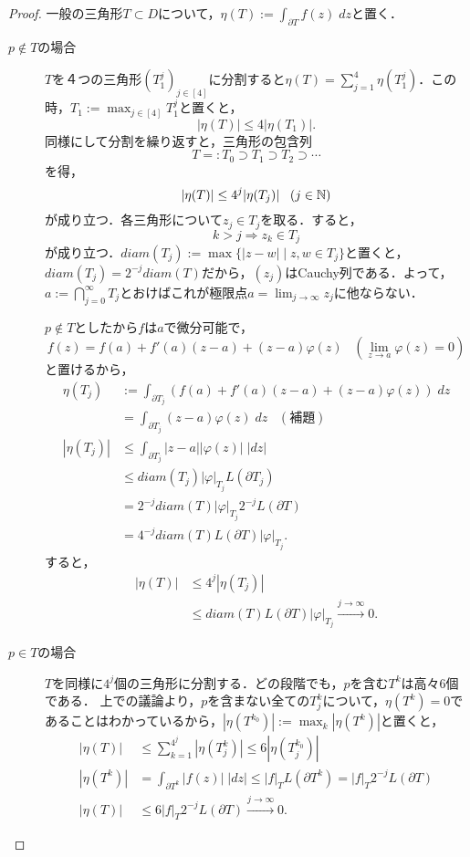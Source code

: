 \documentclass[uplatex, dvipdfmx]{jsreport}
\begin{document}
\begin{proof}
    一般の三角形$T\subset D$について，$\eta(T):=\int_{\partial T}f(z)\;dz$と置く．
    \begin{description}
        \item[$p\notin T$の場合] $T$を４つの三角形$(T_1^j)_{j\in[4]}$に分割すると$\eta(T)=\sum^4_{j=1}\eta(T_1^j)$．この時，$T_1:=\max_{j\in[4]}T_1^j$と置くと，
        \[|\eta(T)|\le 4|\eta(T_1)|.\]
        同様にして分割を繰り返すと，三角形の包含列
        \[ T=:T_0\supset T_1\supset T_2\supset\cdots \]
        を得，
        \[ |\eta(T)|\le 4^{j}|\eta(T_j)|\;\;\;(j\in\mathbb{N}) \]
        が成り立つ．各三角形について$z_j\in T_j$を取る．すると，
        \[ k>j\Rightarrow z_k\in T_j \]
        が成り立つ．$diam(T_j):=\max\{|z-w|\mid z,w\in T_j\}$と置くと，$diam(T_j)=2^{-j}diam(T)$だから，$(z_j)$はCauchy列である．よって，$a:=\bigcap_{j=0}^\infty T_j$とおけばこれが極限点$a=\lim_{j\to\infty}z_j$に他ならない．

        $p\notin T$としたから$f$は$a$で微分可能で，
        \[ f(z)=f(a)+f'(a)(z-a)+(z-a)\varphi(z)\;\;\;(\lim_{z\to a}\varphi(z)=0) \]
        と置けるから，
        \begin{align*}
            \eta(T_j)&:=\int_{\partial T_j}(f(a)+f'(a)(z-a)+(z-a)\varphi(z))\;dz\\
            &=\int_{\partial T_j}(z-a)\varphi(z)\;dz\;\;\;(補題)\\
            |\eta(T_j)|&\le\int_{\partial T_j}|z-a||\varphi(z)|\;|dz|\\
            &\le diam(T_j)|\varphi|_{T_j}L(\partial T_j)\\
            &= 2^{-j}diam(T)|\varphi|_{T_j}2^{-j}L(\partial T)\\
            &= 4^{-j}diam(T)L(\partial T)|\varphi|_{T_j}.
        \end{align*}
        すると，
        \begin{align*}
            |\eta(T)|&\le 4^j|\eta(T_j)|\\
            &\le diam(T)L(\partial T)|\varphi|_{T_j}\xrightarrow{j\to\infty}0.
        \end{align*}
        \item[$p\in T$の場合] $T$を同様に$4^j$個の三角形に分割する．どの段階でも，$p$を含む$T^k$は高々$6$個である．
        上での議論より，$p$を含まない全ての$T^k_j$について，$\eta(T^k)=0$であることはわかっているから，$|\eta(T^{k_0})|:=\max_{k}|\eta(T^k)|$と置くと，
        \begin{align*}
            |\eta(T)|&\le\sum^{4^j}_{k=1}|\eta(T^k_j)|\le 6|\eta(T^{k_0}_j)|\\
            |\eta(T^k)|&=\int_{\partial T^k}|f(z)|\;|dz|\le|f|_TL(\partial T^k)=|f|_T2^{-j}L(\partial T)\\
            |\eta(T)|&\le 6|f|_T2^{-j}L(\partial T)\xrightarrow{j\to\infty}0.
        \end{align*}
    \end{description}
\end{proof}
\end{document}
